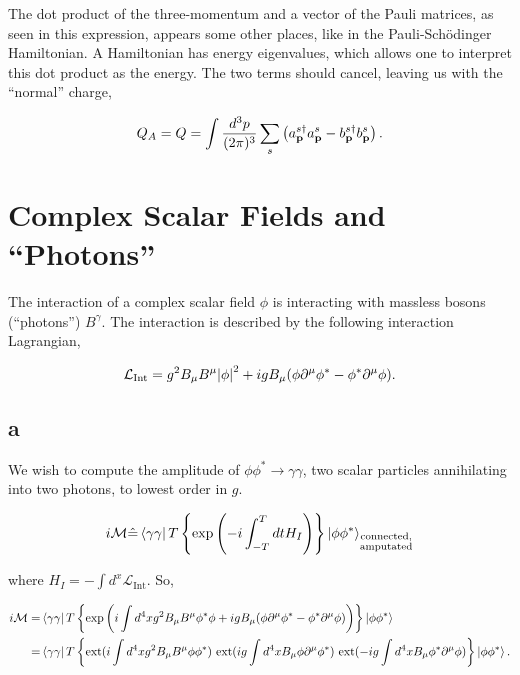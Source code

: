 \documentclass[11pt, a4paper]{amsart}
\begin{document}
The dot product of the three-momentum and a vector of the Pauli matrices, as seen in this expression, appears some other places, like in the Pauli-Schödinger Hamiltonian. A Hamiltonian has energy eigenvalues, which allows one to interpret this dot product as the energy. The two terms should cancel, leaving us with the ``normal'' charge,

\begin{equation}
Q_A = Q = \int \frac{d^3p}{(2\pi)^3}  \sum_s \left(a_{\vb{p}}^{s\dagger}a_{\vb{p}}^s - b_{\vb{p}}^{s\dagger} b_{\vb{p}}^{s} \right).
\end{equation}

\section{Complex Scalar Fields and ``Photons''}

The interaction of a complex scalar field $\phi$ is interacting with massless bosons (``photons'') $B^\gamma$. The interaction is described by the following interaction Lagrangian,

\begin{equation}
\mathcal{L}_{\text{Int}} = g^2 B_\mu B^\mu \abs{\phi}^2 + ig B_\mu (\phi\partial^\mu\phi^* - \phi^* \partial^\mu \phi).
\end{equation}

\subsection*{a}

We wish to compute the amplitude of $\phi\phi^* \rightarrow \gamma\gamma$, two scalar particles annihilating into two photons, to lowest order in $g$.

\begin{equation}
i\mathcal{M} \hat{=} \bra{\gamma\gamma}T\left\{\text{exp}\left(-i\int_{-T}^T dt H_I \right) \right\} \ket{\phi\phi^*}_{\substack{\text{connected,}\\ \text{amputated}}} 
\end{equation}

where $H_I = -\int d^x \mathcal{L}_{\text{Int}}$. So,

\begin{align*}
i \mathcal{M} = &\bra{\gamma\gamma} T \left\{\text{exp} \left( i \int d^4x g^2 B_\mu B^\mu \phi^* \phi + ig B_\mu (\phi \partial^\mu \phi^* - \phi^*\partial^\mu \phi) \right) \right\} \ket{\phi\phi^*} \\
	= &\bra{\gamma\gamma}T \left\{\text{ext}(i\int d^4xg^2B_\mu B^\mu \phi\phi^*)\ \text{ext} (ig \int d^4xB_\mu \phi \partial^\mu \phi^*)\ \text{ext} (-ig \int d^4xB_\mu \phi^* \partial^\mu \phi) \right\}\ket{\phi\phi^*}.
\end{align*}
\end{document}
